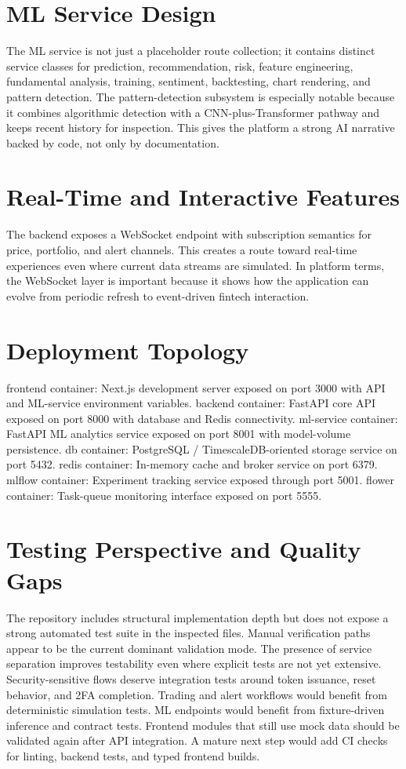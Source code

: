 \documentclass[11pt,a4paper]{article}
\begin{document}
\section{ML Service Design}
The ML service is not just a placeholder route collection; it contains distinct service classes for prediction, recommendation, risk, feature engineering, fundamental analysis, training, sentiment, backtesting, chart rendering, and pattern detection. The pattern-detection subsystem is especially notable because it combines algorithmic detection with a CNN-plus-Transformer pathway and keeps recent history for inspection. This gives the platform a strong AI narrative backed by code, not only by documentation.
\section{Real-Time and Interactive Features}
The backend exposes a WebSocket endpoint with subscription semantics for price, portfolio, and alert channels. This creates a route toward real-time experiences even where current data streams are simulated. In platform terms, the WebSocket layer is important because it shows how the application can evolve from periodic refresh to event-driven fintech interaction.
\section{Deployment Topology}
frontend container: Next.js development server exposed on port 3000 with API and ML-service environment variables. backend container: FastAPI core API exposed on port 8000 with database and Redis connectivity. ml-service container: FastAPI ML analytics service exposed on port 8001 with model-volume persistence. db container: PostgreSQL / TimescaleDB-oriented storage service on port 5432. redis container: In-memory cache and broker service on port 6379. mlflow container: Experiment tracking service exposed through port 5001. flower container: Task-queue monitoring interface exposed on port 5555.
\section{Testing Perspective and Quality Gaps}
The repository includes structural implementation depth but does not expose a strong automated test suite in the inspected files. Manual verification paths appear to be the current dominant validation mode. The presence of service separation improves testability even where explicit tests are not yet extensive. Security-sensitive flows deserve integration tests around token issuance, reset behavior, and 2FA completion. Trading and alert workflows would benefit from deterministic simulation tests. ML endpoints would benefit from fixture-driven inference and contract tests. Frontend modules that still use mock data should be validated again after API integration. A mature next step would add CI checks for linting, backend tests, and typed frontend builds.
\end{document}
